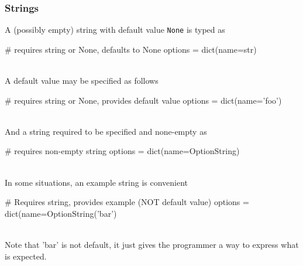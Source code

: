 \subsubsection*{Strings}
A (possibly empty) string with default value \texttt{None} is typed as
\\
\begin{pythonBEG}
  # requires string or None, defaults to None
  options = dict(name=str)
\end{pythonBEG}
\\
A default value may be specified as follows
\\
\begin{pythonMID}
  # requires string or None, provides default value
  options = dict(name='foo')
\end{pythonMID}
\\
And a string required to be specified and none-empty as
\\
\begin{pythonMID}
  # requires non-empty string
  options = dict(name=OptionString)
\end{pythonMID}
\\
In some situations, an example string is convenient
\\
\begin{pythonEND}
  # Requires string, provides example (NOT default value)
  options = dict(name=OptionString('bar')
\end{pythonEND}
\\
Note that 'bar' is not default, it just gives the programmer a way to
express what is expected.



